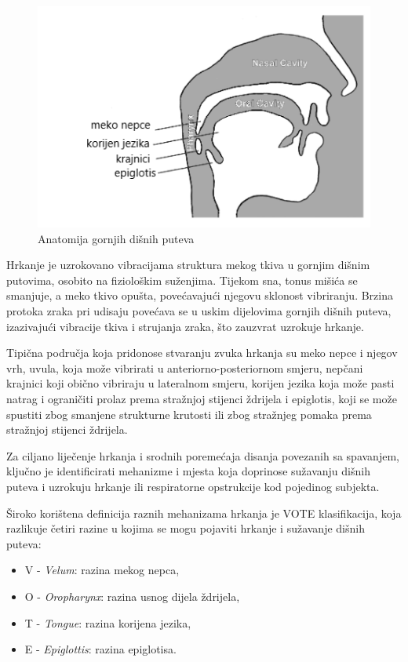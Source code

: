 \begin{figure}[ht]
	\includegraphics[width=\linewidth]{imgs/anatomy}
	\caption{Anatomija gornjih dišnih puteva \cite{snoringml}}
	\label{fig:anatomy}
\end{figure}

Hrkanje je uzrokovano vibracijama struktura mekog tkiva u gornjim dišnim putovima, osobito na fiziološkim suženjima. 
Tijekom sna, tonus mišića se smanjuje, a meko tkivo opušta, povećavajući njegovu sklonost vibriranju. Brzina protoka zraka pri udisaju povećava se u uskim dijelovima gornjih dišnih puteva, izazivajući vibracije tkiva i strujanja zraka, što zauzvrat uzrokuje hrkanje.

Tipična područja koja pridonose stvaranju zvuka hrkanja su meko nepce i njegov vrh, uvula, koja može vibrirati u anteriorno-posteriornom smjeru, nepčani krajnici koji obično vibriraju u lateralnom smjeru, korijen jezika koja može pasti natrag i ograničiti prolaz prema stražnjoj stijenci ždrijela i epiglotis, koji se može spustiti zbog smanjene strukturne krutosti ili zbog stražnjeg pomaka prema stražnjoj stijenci ždrijela.

Za ciljano liječenje hrkanja i srodnih poremećaja disanja povezanih sa spavanjem, ključno je identificirati mehanizme i mjesta koja doprinose sužavanju dišnih puteva i uzrokuju hrkanje ili respiratorne opstrukcije kod pojedinog subjekta.


Široko korištena definicija raznih mehanizama hrkanja je VOTE klasifikacija, koja razlikuje četiri razine u kojima se mogu pojaviti hrkanje i sužavanje dišnih puteva:
\begin{itemize}
	\item V - \textit{Velum}: razina mekog nepca, 
	\item O - \textit{Oropharynx}: razina usnog dijela ždrijela,  
	\item T - \textit{Tongue}: razina korijena jezika, 
	\item E - \textit{Epiglottis}: razina epiglotisa. 
\end{itemize}

